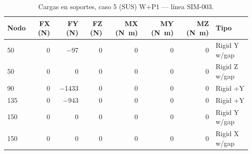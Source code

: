 \begin{table}[htbp]
  \centering
  \footnotesize
  \caption{Cargas en soportes, caso 5 (SUS) W+P1 — línea SIM-003.}
  \label{tab:restricciones-sus}
  \begin{tabular}{lrrrrrrl}
    \toprule
    Nodo & FX (\si{N}) & FY (\si{N}) & FZ (\si{N}) & MX (\si{N.m}) & MY (\si{N.m}) & MZ (\si{N.m}) & Tipo \\
    \midrule
    50 & \num{0} & \num{-97} & \num{0} & \num{0} & \num{0} & \num{0} & Rigid Y w/gap \\
    50 & \num{0} & \num{0} & \num{0} & \num{0} & \num{0} & \num{0} & Rigid Z w/gap \\
    90 & \num{0} & \num{-1433} & \num{0} & \num{0} & \num{0} & \num{0} & Rigid +Y \\
    135 & \num{0} & \num{-943} & \num{0} & \num{0} & \num{0} & \num{0} & Rigid +Y \\
    150 & \num{0} & \num{0} & \num{0} & \num{0} & \num{0} & \num{0} & Rigid Y w/gap \\
    150 & \num{0} & \num{0} & \num{0} & \num{0} & \num{0} & \num{0} & Rigid X w/gap \\
    \bottomrule
  \end{tabular}
\end{table}

